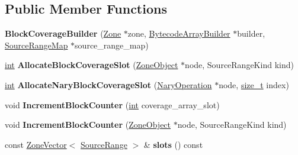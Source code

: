 \subsection*{Public Member Functions}
\begin{DoxyCompactItemize}
\item 
\mbox{\label{classv8_1_1internal_1_1interpreter_1_1BlockCoverageBuilder_ae9671572a17615f32daf9b84beb40bc9}} 
{\bfseries Block\+Coverage\+Builder} (\mbox{\hyperlink{classv8_1_1internal_1_1Zone}{Zone}} $\ast$zone, \mbox{\hyperlink{classv8_1_1internal_1_1interpreter_1_1BytecodeArrayBuilder}{Bytecode\+Array\+Builder}} $\ast$builder, \mbox{\hyperlink{classv8_1_1internal_1_1SourceRangeMap}{Source\+Range\+Map}} $\ast$source\+\_\+range\+\_\+map)
\item 
\mbox{\label{classv8_1_1internal_1_1interpreter_1_1BlockCoverageBuilder_abfad34b8d3e486dfb32356995fa5ddc1}} 
\mbox{\hyperlink{classint}{int}} {\bfseries Allocate\+Block\+Coverage\+Slot} (\mbox{\hyperlink{classv8_1_1internal_1_1ZoneObject}{Zone\+Object}} $\ast$node, Source\+Range\+Kind kind)
\item 
\mbox{\label{classv8_1_1internal_1_1interpreter_1_1BlockCoverageBuilder_a693c9c36aec5d9bfd32d985f4cb34a29}} 
\mbox{\hyperlink{classint}{int}} {\bfseries Allocate\+Nary\+Block\+Coverage\+Slot} (\mbox{\hyperlink{classv8_1_1internal_1_1NaryOperation}{Nary\+Operation}} $\ast$node, \mbox{\hyperlink{classsize__t}{size\+\_\+t}} index)
\item 
\mbox{\label{classv8_1_1internal_1_1interpreter_1_1BlockCoverageBuilder_a1eaf1074a7ed1354ad4a420882c4adbb}} 
void {\bfseries Increment\+Block\+Counter} (\mbox{\hyperlink{classint}{int}} coverage\+\_\+array\+\_\+slot)
\item 
\mbox{\label{classv8_1_1internal_1_1interpreter_1_1BlockCoverageBuilder_ab0b169aba46421cc6e15ccba40fcf836}} 
void {\bfseries Increment\+Block\+Counter} (\mbox{\hyperlink{classv8_1_1internal_1_1ZoneObject}{Zone\+Object}} $\ast$node, Source\+Range\+Kind kind)
\item 
\mbox{\label{classv8_1_1internal_1_1interpreter_1_1BlockCoverageBuilder_a66780344c199fa8221b300713453b06a}} 
const \mbox{\hyperlink{classv8_1_1internal_1_1ZoneVector}{Zone\+Vector}}$<$ \mbox{\hyperlink{structv8_1_1internal_1_1SourceRange}{Source\+Range}} $>$ \& {\bfseries slots} () const
\end{DoxyCompactItemize}
